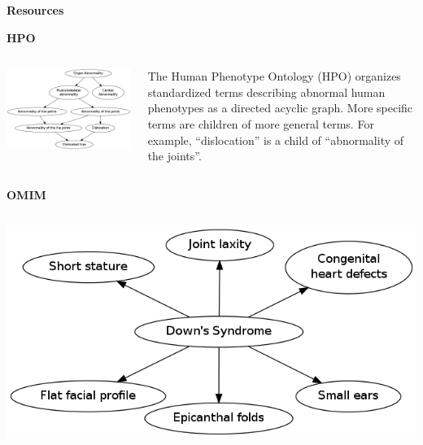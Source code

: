 \documentclass[final]{beamer} %
\begin{document}
\begin{frame}{}
\begin{columns}[T]
\begin{column}{0.3\linewidth}
{    \begin{block}{\Huge \textbf{Resources}}
      \begin{block}{\Large \textbf{HPO}}
        \begin{columns}[T]
          \begin{column}{.5\textwidth}
            \centering \includegraphics[width = .9\textwidth]{hpo}
          \end{column}
          \begin{column}{.5\textwidth}
            \Large The Human Phenotype Ontology (HPO) organizes
            standardized terms describing abnormal human phenotypes as
            a directed acyclic graph. More specific terms are children
            of more general terms. For example, ``dislocation'' is a
            child of ``abnormality of the joints''.
          \end{column}
        \end{columns}
      \end{block}

      \begin{block}{\Large \textbf{OMIM}}
        \begin{columns}[T]
          \begin{column}{.5\textwidth}
            \centering \includegraphics[width =
            .9\textwidth]{omim_vis}
          \end{column}
        

\end{columns}
\end{block}
\end{block}}
\end{column}
\end{columns}
\end{frame}
\end{document}
